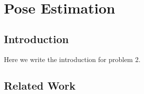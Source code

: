 \chapter{Pose Estimation} \label{ch:2-pose-estimation}

\section{Introduction} \label{sec:2-pose-estimation-introduction}
Here we write the introduction for problem 2.

\section{Related Work} \label{sec:2-pose-estimation-related-work}

